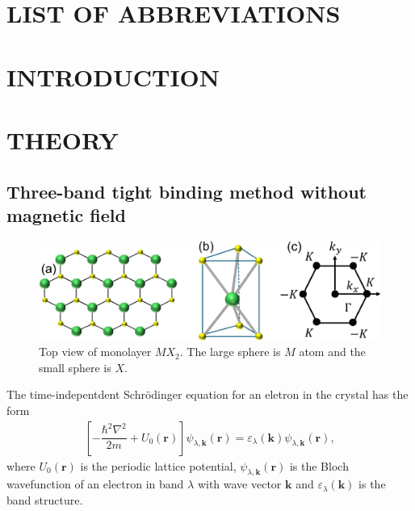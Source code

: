 \documentclass{report}
\newcommand{\f}[2]{\dfrac{#1}{#2}}
\begin{document}
\chapter*{\MakeUppercase{List of Abbreviations}}
\begin{acronym} %
\end{acronym}
\newpage
{}
\chapter{\textbf{INTRODUCTION}}
\chapter{\textbf{THEORY}}
\section{Three-band tight binding method without magnetic field}
\begin{figure}[H]
	\centering
	\includegraphics[width=1.02\textwidth,height=0.3\linewidth]{pic/lattice_crop.pdf}
	\caption[TMD structure and its first Brillouin zone]{\label{fig:Lattice} Top view of monolayer $MX_{2}$. The large sphere is $M$ atom and the small sphere is $X$.}
\end{figure}
The time-indepentdent Schr\"{o}dinger equation for an eletron in the crystal has the form
\begin{gather}
	\left[-\f{\hbar^{2} \nabla^{2}}{2m} + U_{0}(\mathbf{r})\right] \psi_{\lambda,\mathbf{k}}(\mathbf{r}) = \varepsilon_{\lambda}(\mathbf{k}) \psi_{\lambda,\mathbf{k}}(\mathbf{r}),
\end{gather}
where $U_{0}(\mathbf{r})$ is the periodic lattice potential, $\psi_{\lambda,\mathbf{k}}(\mathbf{r})$ is the Bloch wavefunction of an electron in band $\lambda$ with wave vector $\mathbf{k}$ and $\varepsilon_{\lambda}(\mathbf{k})$ is the band structure.
\end{document}
